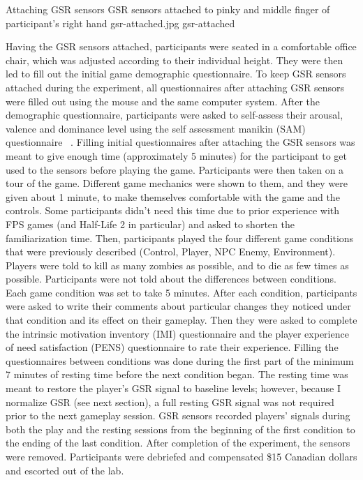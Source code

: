 \img
{Attaching GSR sensors}
{GSR sensors attached to pinky and middle finger of participant's right hand}
{gsr-attached.jpg}
{gsr-attached}

Having the GSR sensors attached, participants were seated in a comfortable office chair, which was adjusted according to their individual height. They were then led to fill out the initial game demographic questionnaire. To keep GSR sensors attached during the experiment, all questionnaires after attaching GSR sensors were filled out using the mouse and the same computer system. After the demographic questionnaire, participants were asked to self-assess their arousal, valence and dominance level using the self assessment manikin (SAM) questionnaire ~\cite{bradley1994measuring}. Filling initial questionnaires after attaching the GSR sensors was meant to give enough time (approximately 5 minutes) for the participant to get used to the sensors before playing the game. Participants were then taken on a tour of the game. Different game mechanics were shown to them, and they were given about 1 minute, to make themselves comfortable with the game and the controls. Some participants didn't need this time due to prior experience with FPS games (and Half-Life 2 in particular) and asked to shorten the familiarization time. Then, participants played the four different game conditions that were previously described (Control, Player, NPC Enemy, Environment). Players were told to kill as many zombies as possible, and to die as few times as possible. Participants were not told about the differences between conditions. Each game condition was set to take 5 minutes. After each condition, participants were asked to write their comments about particular changes they noticed under that condition and its effect on their gameplay. Then they were asked to complete the intrinsic motivation inventory (IMI) questionnaire and the player experience of need satisfaction (PENS) questionnaire to rate their experience. Filling the questionnaires between conditions was done during the first part of the minimum 7 minutes of resting time before the next condition began. The resting time was meant to restore the player's GSR signal to baseline levels; however, because I normalize GSR (see next section), a full resting GSR signal was not required prior to the next gameplay session. GSR sensors recorded players' signals during both the play and the resting sessions from the beginning of the first condition to the ending of the last condition. After completion of the experiment, the sensors were removed. Participants were debriefed and compensated \$15 Canadian dollars and escorted out of the lab.


